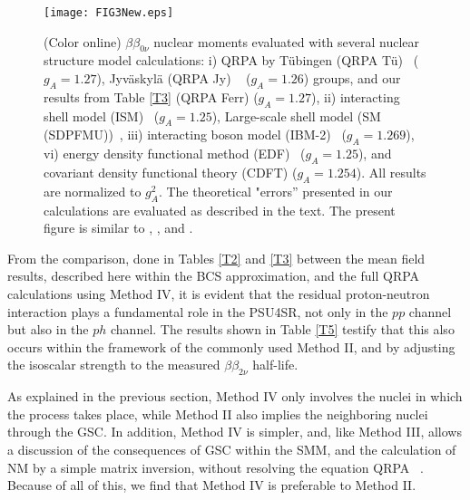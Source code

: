 \documentclass[nofootinbib,twocolumn,eqsecnum,floats,aps]{revtex4}
\def\b {{\beta}}
\begin{document}
{\begin{figure}[t]
\centering
\texttt{[image: FIG3New.eps]}
\caption{\label{F3}(Color online)   $\b\b_{0\nu}$
nuclear moments
evaluated with
several nuclear structure model calculations:
i) QRPA by  T\"{u}bingen (QRPA T\"{u})~\cite{Sim13}  ($g_A=1.27$),
Jyv\"{a}skyl\"{a} (QRPA Jy) ~\cite{Hyv15} ($g_A=1.26$) groups, and
our results from Table \ref{T3} (QRPA Ferr) ($g_A=1.27$),
ii) interacting shell model (ISM)~\cite{Men09} ($g_A=1.25$),
Large-scale shell model (SM (SDPFMU))~\cite{Iwa16},
iii) interacting boson model (IBM-2)~\cite{IBM-2} ($g_A=1.269$),
vi) energy density functional method (EDF)~\cite{EDF}  ($g_A=1.25$),
and covariant density functional theory
(CDFT) \cite{Son14,Yao15}  ($g_A=1.254$). All  results are normalized to $g_A^2$.
The theoretical "errors'' presented in our calculations are
evaluated as described in the text. 
The present  figure is similar
to \cite[Fig. 7] {Yao15}, \cite[Fig. 5]{Eng16}\cite[Fig. 4]{Gom15}, and \cite[Fig. 1]{Men16}  .}
\end{figure}

From the comparison, done in Tables \ref{T2} and \ref{T3} between
the mean field results, described here within the BCS approximation,
and the full QRPA calculations   using Method IV, it is evident that the residual proton-neutron
interaction plays a fundamental role in the PSU4SR, %
not only in the $pp$ channel but also in the $ph$ channel.
The results shown in Table \ref {T5} testify that this also occurs within the framework of the commonly used
Method II, and by adjusting the isoscalar strength to the measured
$\b\b_{2\nu}$ half-life.

As explained in the previous section, Method IV only involves the nuclei in which the process takes place, while Method II also implies the neighboring nuclei through the GSC.
In addition, Method IV is simpler, and, like Method III, allows a discussion of the consequences of GSC within the SMM, and the calculation of NM by a simple matrix inversion, without resolving the equation QRPA ~\cite {Hir90}. Because of all of this, we find that Method IV is preferable to Method II.

}
\end{document}
